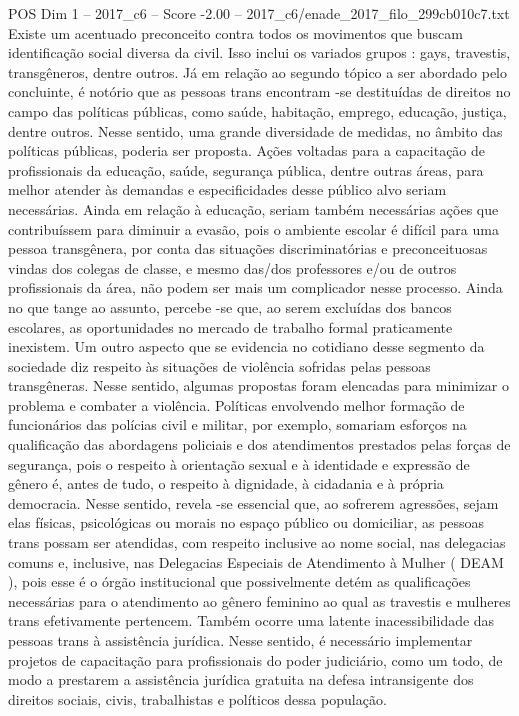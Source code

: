 \begin{textsample}{POS Dim 1 – 2017\_c6 – Score -2.00 – 2017\_c6/enade\_2017\_filo\_299cb010c7.txt}
Existe um acentuado preconceito contra todos os movimentos que buscam identificação social diversa da civil.
Isso inclui os variados grupos : gays, travestis, transgêneros, dentre outros.
Já em relação ao segundo tópico a ser abordado pelo concluinte, é notório que as pessoas trans encontram -se destituídas de direitos no campo das políticas públicas, como saúde, habitação, emprego, educação, justiça, dentre outros.
Nesse sentido, uma grande diversidade de medidas, no âmbito das políticas públicas, poderia ser proposta.
Ações voltadas para a capacitação de profissionais da educação, saúde, segurança pública, dentre outras áreas, para melhor atender às demandas e especificidades desse público alvo seriam necessárias.
Ainda em relação à educação, seriam também necessárias ações que contribuíssem para diminuir a evasão, pois o ambiente escolar é difícil para uma pessoa transgênera, por conta das situações discriminatórias e preconceituosas vindas dos colegas de classe, e mesmo das/dos professores e/ou de outros profissionais da área, não podem ser mais um complicador nesse processo.
Ainda no que tange ao assunto, percebe -se que, ao serem excluídas dos bancos escolares, as oportunidades no mercado de trabalho formal praticamente inexistem.
Um outro aspecto que se evidencia no cotidiano desse segmento da sociedade diz respeito às situações de violência sofridas pelas pessoas transgêneras.
Nesse sentido, algumas propostas foram elencadas para minimizar o problema e combater a violência.
Políticas envolvendo melhor formação de funcionários das polícias civil e militar, por exemplo, somariam esforços na qualificação das abordagens policiais e dos atendimentos prestados pelas forças de segurança, pois o respeito à orientação sexual e à identidade e expressão de gênero é, antes de tudo, o respeito à dignidade, à cidadania e à própria democracia.
Nesse sentido, revela -se essencial que, ao sofrerem agressões, sejam elas físicas, psicológicas ou morais no espaço público ou domiciliar, as pessoas trans possam ser atendidas, com respeito inclusive ao nome social, nas delegacias comuns e, inclusive, nas Delegacias Especiais de Atendimento à Mulher ( DEAM ), pois esse é o órgão institucional que possivelmente detém as qualificações necessárias para o atendimento ao gênero feminino ao qual as travestis e mulheres trans efetivamente pertencem.
Também ocorre uma latente inacessibilidade das pessoas trans à assistência jurídica.
Nesse sentido, é necessário implementar projetos de capacitação para profissionais do poder judiciário, como um todo, de modo a prestarem a assistência jurídica gratuita na defesa intransigente dos direitos sociais, civis, trabalhistas e políticos dessa população.

\end{textsample}

